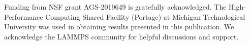 \documentclass[journal abbreviation, manuscript]{copernicus}
\begin{document}


\begin{acknowledgements}
Funding from NSF grant AGS-2019649 is gratefully acknowledged. The High-Performance Computing Shared Facility (Portage) at Michigan Technological University was used in obtaining results presented in this publication. We acknowledge the LAMMPS community for helpful discussions and support.
\end{acknowledgements}

%


\end{document}
